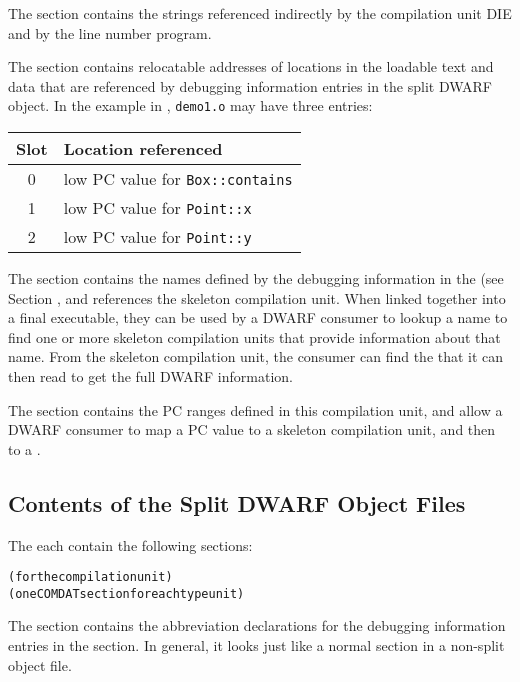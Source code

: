 The \dotdebugstr{} section contains the strings referenced indirectly
by the compilation unit DIE and by the line number program.

The \dotdebugaddr{} section contains relocatable addresses of
locations in the loadable text and data that are referenced by
debugging information entries in the split DWARF object. In the
example in , 
\texttt{demo1.o} may have three entries:
\begin{center}
\begin{tabular}{cl}
Slot & Location referenced \\
\hline
   0   &  low PC value for \texttt{Box::contains}  \\
   1   &  low PC value for \texttt{Point::x}       \\
   2   &  low PC value for \texttt{Point::y}       \\
\end{tabular}
\end{center}

The \dotdebugnames{}
section contains the names defined by the debugging
information in the \splitDWARFobjectfile{} 
(see Section , 
and references the skeleton compilation unit. 
When linked together into a final executable,
they can be used by a DWARF consumer to lookup a name to find one
or more skeleton compilation units that provide information about
that name. From the skeleton compilation unit, the consumer can
find the \splitDWARFobjectfile{} that it can then read to get the full
DWARF information.

The \dotdebugaranges{} section contains the PC ranges defined in this
compilation unit, and allow a DWARF consumer to map a PC value to
a skeleton compilation unit, and then to a \splitDWARFobjectfile.


\subsection{Contents of the Split DWARF Object Files}
The  each contain the following sections:
\begin{alltt}
  \dotdebugabbrevdwo
  \dotdebuginfodwo{} (for the compilation unit)
  \dotdebuginfodwo{} (one COMDAT section for each type unit)
  \dotdebuglocdwo
  \dotdebuglinedwo
  \dotdebugmacrodwo
  \dotdebugstroffsetsdwo
  \dotdebugstrdwo
\end{alltt}
The \dotdebugabbrevdwo{} section contains the abbreviation
declarations for the debugging information entries in the
\dotdebuginfodwo{} section. In general, it looks just like a normal
\dotdebugabbrev{} section in a non-split object file.

